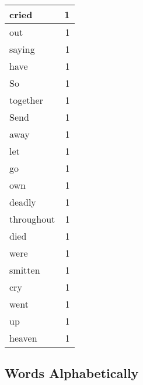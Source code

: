 \begin{center}
\begin{longtable}{l|r}
cried & 1 \\ \hline
out & 1 \\ \hline
saying & 1 \\ \hline
have & 1 \\ \hline
So & 1 \\ \hline
together & 1 \\ \hline
Send & 1 \\ \hline
away & 1 \\ \hline
let & 1 \\ \hline
go & 1 \\ \hline
own & 1 \\ \hline
deadly & 1 \\ \hline
throughout & 1 \\ \hline
died & 1 \\ \hline
were & 1 \\ \hline
smitten & 1 \\ \hline
cry & 1 \\ \hline
went & 1 \\ \hline
up & 1 \\ \hline
heaven & 1 \\ \hline
\end{longtable}
\end{center}



\normalsize



\subsection{Words Alphabetically}

